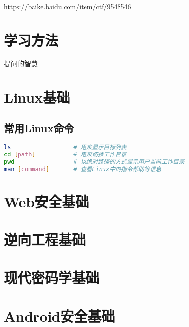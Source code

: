 \indent \href{https://baike.baidu.com/item/ctf/9548546}{https://baike.baidu.com/item/ctf/9548546}

\section{学习方法}
\indent \setlength{\parindent}{2em}
\indent \href{https://github.com/ryanhanwu/How-To-Ask-Questions-The-Smart-Way}{提问的智慧}

\section{Linux基础}
\indent \setlength{\parindent}{2em}

\subsection{常用Linux命令}
\begin{lstlisting}[language=bash, style=customStyleBashDark, caption=Snippet title]
ls                  # 用来显示目标列表
cd [path]           # 用来切换工作目录
pwd                 # 以绝对路径的方式显示用户当前工作目录
man [command]       # 查看Linux中的指令帮助等信息
\end{lstlisting}


\section{Web安全基础}
\indent \setlength{\parindent}{2em}

\section{逆向工程基础}
\indent \setlength{\parindent}{2em}

\section{现代密码学基础}
\indent \setlength{\parindent}{2em}

\section{Android安全基础}
\indent \setlength{\parindent}{2em}

